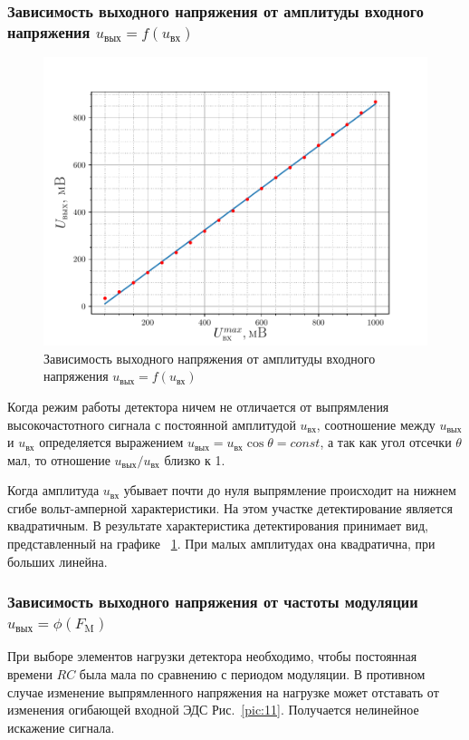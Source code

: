 \subsubsection{Зависимость выходного напряжения от амплитуды входного напряжения $u_\text{вых}=f(u_\text{вх})$}
\begin{figure}[h!]
	\centering
	\includegraphics[width=0.8\linewidth]{fig/exp3a.pdf}
	\caption{Зависимость выходного напряжения от амплитуды входного напряжения $u_\text{вых}=f(u_\text{вх})$}
	\label{exp:3.2}
\end{figure}

Когда режим работы детектора ничем не отличается от выпрямления высокочастотного сигнала с постоянной амплитудой $u_\text{вх}$, соотношение между $u_\text{вых}$ и $u_\text{вх}$ определяется выражением $u_\text{вых}=u_\text{вх}\cos\theta=const$, а так как угол отсечки $\theta$ мал, то отношение $u_\text{вых}/u_\text{вх}$ близко к 1.

Когда амплитуда $u_\text{вх}$ убывает почти до нуля выпрямление происходит на нижнем сгибе вольт-амперной характеристики. На этом участке детектирование является квадратичным. В результате характеристика детектирования принимает вид, представленный на графике ~\ref{exp:3.2}. При малых амплитудах она квадратична, при больших линейна.  
\subsubsection{Зависимость выходного напряжения от частоты модуляции  $u_{\text{вых}} = \phi(F_{\text{M}})$}

При выборе элементов нагрузки детектора необходимо, чтобы постоянная времени $RC$ была мала по сравнению с периодом модуляции. В противном случае изменение выпрямленного напряжения на нагрузке может отставать от изменения огибающей входной ЭДС Рис.~\ref{pic:11}. Получается нелинейное искажение сигнала. 

